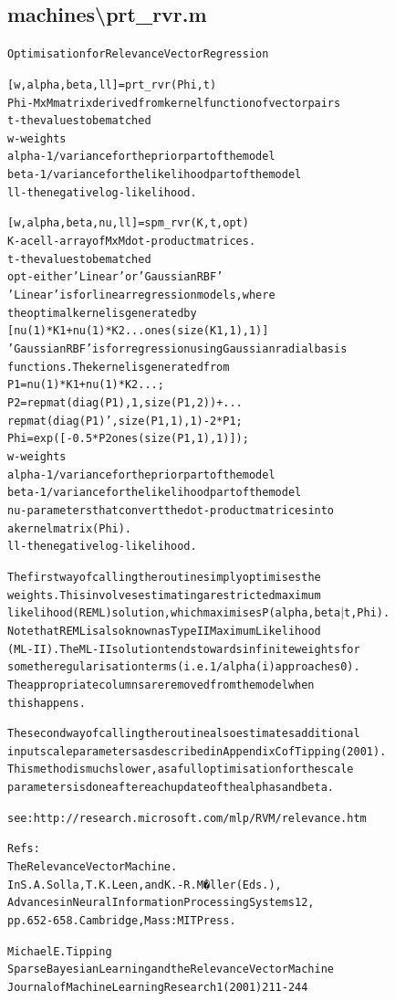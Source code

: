 \subsection{machines\textbackslash prt\_rvr.m}
\begin{alltt}

 Optimisation for Relevance Vector Regression
 
 [w,alpha,beta,ll] = prt\_rvr(Phi,t)
 Phi   - MxM matrix derived from kernel function of vector pairs
 t     - the values to be matched
 w     - weights
 alpha - 1/variance for the prior part of the model
 beta  - 1/variance for the likelihood part of the model
 ll    - the negative log-likelihood.
 
 [w,alpha,beta,nu,ll]=spm\_rvr(K,t,opt)
 K     - a cell-array of MxM dot-product matrices.
 t     - the values to be matched
 opt   - either 'Linear' or 'Gaussian RBF'
         'Linear'       is for linear regression models, where
                        the optimal kernel is generated by
                        [nu(1)*K{1} + nu(1)*K{2}... ones(size(K{1},1),1)]
         'Gaussian RBF' is for regression using Gaussian radial basis
                        functions.  The kernel is generated from
                        P1  = nu(1)*K{1} + nu(1)*K{2} ... ;
                        P2  = repmat(diag(P1) ,1,size(P1,2)) +...
                              repmat(diag(P1)',size(P1,1),1) - 2*P1;
                        Phi = exp([-0.5*P2 ones(size(P1,1),1)]);
 w     - weights
 alpha - 1/variance for the prior part of the model
 beta  - 1/variance for the likelihood part of the model
 nu    - parameters that convert the dot-product matrices into
         a kernel matrix (Phi).
 ll    - the negative log-likelihood.
 
 The first way of calling the routine simply optimises the
 weights.  This involves estimating a restricted maximum
 likelihood (REML) solution, which maximises P(alpha,beta$|$t,Phi).
 Note that REML is also known as Type II Maximum Likelihood
 (ML-II). The ML-II solution tends towards infinite weights for
 some the regularisation terms (i.e. 1/alpha(i) approaches 0).
 The appropriate columns are removed from the model when
 this happens.
 
 The second way of calling the routine also estimates additional
 input scale parameters as described in Appendix C of Tipping (2001).
 This method is much slower, as a full optimisation for the scale
 parameters is done after each update of the alphas and beta.
 
 see: http://research.microsoft.com/mlp/RVM/relevance.htm
 
 Refs:
 The Relevance Vector Machine.
 In S. A. Solla, T. K. Leen, and K.-R. M�ller (Eds.),
 Advances in Neural Information Processing Systems 12,
 pp.  652-658. Cambridge, Mass: MIT Press.
 
 Michael E. Tipping
 Sparse Bayesian Learning and the Relevance Vector Machine
 Journal of Machine Learning Research 1 (2001) 211-244
\end{alltt}


